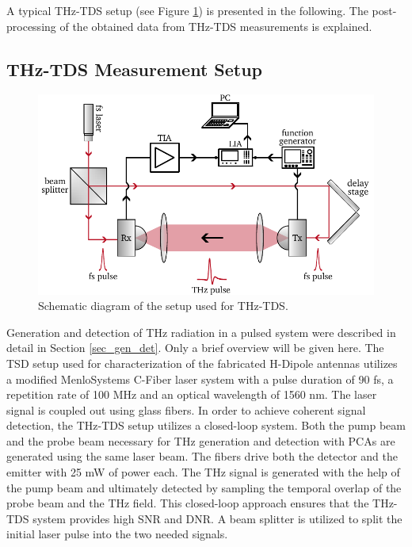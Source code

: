 A typical THz-TDS setup  (see Figure \ref{fig_TDS}) is presented in the following. The post-processing of the obtained data from THz-TDS measurements is explained. 

\subsection{THz-TDS Measurement Setup}

\begin{figure}[!b]
    \includegraphics[width=0.9\linewidth]{figures/TDS_schematic.pdf}
    \centering
    \caption{Schematic diagram of the setup used for THz-TDS.}
    \label{fig_TDS}
\end{figure}

Generation and detection of THz radiation in a pulsed system were described in detail in Section \ref{sec_gen_det}. Only a brief overview will be given here. The TSD setup used for characterization of the fabricated H-Dipole antennas utilizes a modified MenloSystems C-Fiber \cite{FemtosecondErbiumLaser} laser system with a pulse duration of \num{90} \si{\femto \s}, a repetition rate of \num{100} \si{\mega \hertz} and an optical wavelength of \num{1560} \si{\nano \meter}. The laser signal is coupled out using glass fibers. In order to achieve coherent signal detection, the THz-TDS setup utilizes a closed-loop system. Both the pump beam and the probe beam necessary for THz generation and detection with PCAs are generated using the same laser beam. The fibers drive both the detector and the emitter with \num{25} \si{\milli \watt} of power each. The THz signal is generated with the help of the pump beam and ultimately detected by sampling the temporal overlap of the probe beam and the THz field. This closed-loop approach ensures that the THz-TDS system provides high SNR and DNR. A beam splitter is utilized to split the initial laser pulse into the two needed signals. 

